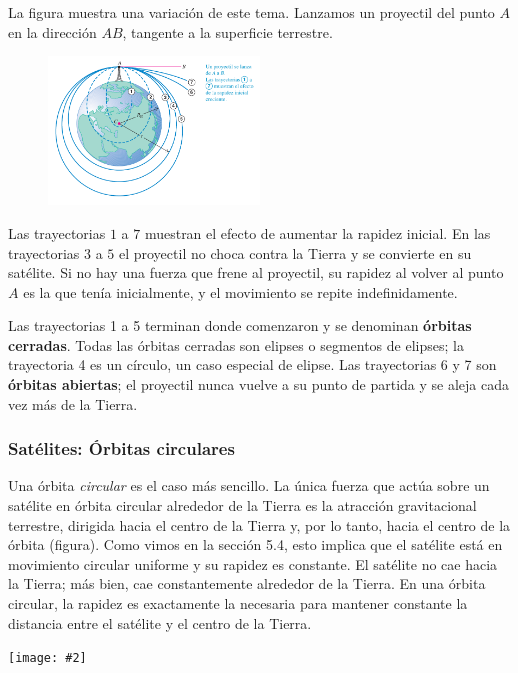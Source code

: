 \documentclass{article}
\newcommand{\newtitle}[1]{
    \color{titleColor}
    \subsubsection{#1}
    \color{black}
}
\newcommand{\bl}[1]{\textbf{#1}}
\newcommand{\ladoALado}[4]{
    \begin{minipage}[t]{#3\textwidth}
        \vspace{0pt}
        #1
    \end{minipage}
    \hfill
    \begin{minipage}[t]{#4\textwidth}
        \vspace{0pt}
        \centering
        \texttt{[image: \#2]}
    \end{minipage}
}
\begin{document}
    \vspace{0.5cm}

    \par La ﬁgura muestra una variación de este tema. Lanzamos un proyectil del punto $A$ en la dirección $AB$, tangente a la superﬁcie terrestre.

    \begin{figure}[H]
        \centering
        \includegraphics[width=0.5\textwidth]{img/11.4-1.png}
    \end{figure}

    \par Las trayectorias $1$ a $7$ muestran el efecto de aumentar la rapidez inicial. En las trayectorias $3$ a $5$ el proyectil no choca contra la Tierra y se convierte en su satélite. Si no hay una fuerza que frene al proyectil, su rapidez al volver al punto $A$ es la que tenía inicialmente, y el movimiento se repite indeﬁnidamente.

    \par Las trayectorias 1 a 5 terminan donde comenzaron y se denominan \bl{órbitas cerradas}. Todas las órbitas cerradas son elipses o segmentos de elipses; la trayectoria 4 es un círculo, un caso especial de elipse. Las trayectorias 6 y 7 son \bl{órbitas abiertas}; el proyectil nunca vuelve a su punto de partida y se aleja cada vez más de la Tierra.

    \newtitle{Satélites: Órbitas circulares}

    \ladoALado{
        \par Una órbita \textit{circular} es el caso más sencillo. La única fuerza que actúa sobre un satélite en órbita circular alrededor de la Tierra es la atracción gravitacional terrestre, dirigida hacia el centro de la Tierra y, por lo tanto, hacia el centro de la órbita (ﬁgura). Como vimos en la sección 5.4, esto implica que el satélite está en movimiento circular uniforme y su rapidez es constante. El satélite no cae hacia la Tierra; más bien, cae constantemente alrededor de la Tierra. En una órbita circular, la rapidez es exactamente la necesaria para mantener constante la distancia entre el satélite y el centro de la Tierra.
    }{img/11.4-2.png}{0.5}{0.5}
\end{document}
